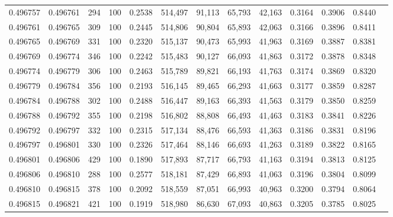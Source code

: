 \begin{tabular}{rrrrrrrrrrrrr}
0.496757 & 0.496761 &   294 & 100 &                                     0.2538 & 514,497 &  91,113 &  65,793 &  42,163 & 0.3164 & 0.3906 & 0.8440 \\
0.496761 & 0.496765 &   309 & 100 &                                     0.2445 & 514,806 &  90,804 &  65,893 &  42,063 & 0.3166 & 0.3896 & 0.8411 \\
0.496765 & 0.496769 &   331 & 100 &                                     0.2320 & 515,137 &  90,473 &  65,993 &  41,963 & 0.3169 & 0.3887 & 0.8381 \\
0.496769 & 0.496774 &   346 & 100 &                                     0.2242 & 515,483 &  90,127 &  66,093 &  41,863 & 0.3172 & 0.3878 & 0.8348 \\
0.496774 & 0.496779 &   306 & 100 &                                     0.2463 & 515,789 &  89,821 &  66,193 &  41,763 & 0.3174 & 0.3869 & 0.8320 \\
0.496779 & 0.496784 &   356 & 100 &                                     0.2193 & 516,145 &  89,465 &  66,293 &  41,663 & 0.3177 & 0.3859 & 0.8287 \\
0.496784 & 0.496788 &   302 & 100 &                                     0.2488 & 516,447 &  89,163 &  66,393 &  41,563 & 0.3179 & 0.3850 & 0.8259 \\
0.496788 & 0.496792 &   355 & 100 &                                     0.2198 & 516,802 &  88,808 &  66,493 &  41,463 & 0.3183 & 0.3841 & 0.8226 \\
0.496792 & 0.496797 &   332 & 100 &                                     0.2315 & 517,134 &  88,476 &  66,593 &  41,363 & 0.3186 & 0.3831 & 0.8196 \\
0.496797 & 0.496801 &   330 & 100 &                                     0.2326 & 517,464 &  88,146 &  66,693 &  41,263 & 0.3189 & 0.3822 & 0.8165 \\
0.496801 & 0.496806 &   429 & 100 &                                     0.1890 & 517,893 &  87,717 &  66,793 &  41,163 & 0.3194 & 0.3813 & 0.8125 \\
0.496806 & 0.496810 &   288 & 100 &                                     0.2577 & 518,181 &  87,429 &  66,893 &  41,063 & 0.3196 & 0.3804 & 0.8099 \\
0.496810 & 0.496815 &   378 & 100 &                                     0.2092 & 518,559 &  87,051 &  66,993 &  40,963 & 0.3200 & 0.3794 & 0.8064 \\
0.496815 & 0.496821 &   421 & 100 &                                     0.1919 & 518,980 &  86,630 &  67,093 &  40,863 & 0.3205 & 0.3785 & 0.8025 \\

\end{tabular}
